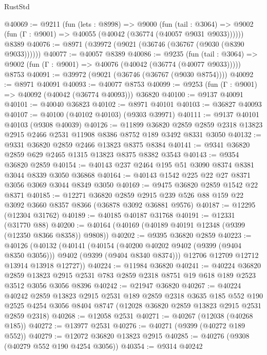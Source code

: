 \begin{lexlean}{RustStd}
\begin{coremodule}
@40069 := @9211
    (fun (lets : @8998) =>
    @9000
      (fun (tail : @3064) =>
      @9002 (fun (Γ : @9001) => @40055 (@40042 (@36774 (@40057 @9031 @9033))))))
    @8389
@40076 := @8971 (@39972 (@9021 (@36746 (@36767 (@9030 (@8390 @9033))))))
@40077 := @40057 @8389
@40086 := @9235
    (fun (tail : @3064) => @9002 (fun (Γ : @9001) => @40076 (@40042 (@36774 (@40077 @9033)))))
    @8753
@40091 := @39972 (@9021 (@36746 (@36767 (@9030 @8754))))
@40092 := @8971 @40091
@40093 := @40077 @8753
@40099 := @9253 (fun (Γ : @9001) => @40092 (@40042 (@36774 @40093))) @36820
@40100 := @9137 @40091
@40101 := @40040 @36823
@40102 := @8971 @40101
@40103 := @36827 @40093
@40107 := @40100 (@40102 @40103) (@9303 @39971)
@40111 := @9137 @40101 @40103 (@9308 @40039)
@40126 := @11899
    @36820
    @2859
    @2859
    @2318
    @13823
    @2915
    @2466
    @2531
    @11908
    @8386
    @8752
    @189
    @3492
    @8331
    @3050
@40132 := @9331 @36820 @2859 @2466 @13823 @8375 @8384
@40141 := @9341 @36820 @2859 @629 @2465 @1315 @13823 @8375 @8382 @3543
@40143 := @9354 @36820 @2859
@40154 := @40143 @237 @2464 @195 @51 @3090 @8374 @8381 @3044 @8339 @3050 @36868
@40164 := @40143 @1542 @225 @22 @27 @8371 @3056 @3069 @3044 @8349 @3050
@40169 := @9475 @36820 @2859 @1542 @22 @8371
@40185 := @12271
    @36820
    @2859
    @2915
    @239
    @526
    @88
    @159
    @22
    @3092
    @3660
    @8357
    @8366
    (@36878 @3092 @36881 @9576)
@40187 := @12295 (@12304 @31762)
@40189 := @40185 @40187 @31768
@40191 := @12331 (@31770 @88)
@40200 := @40164 (@40169 (@40189 @40191 @12348 (@9399 (@12350 @8366 @8358)) @9808))
@40202 := @9395 @36820 @2859
@40223 := @40126
    (@40132
      (@40141
        (@40154 (@40200 @40202 @9402 (@9399 (@9404 @8350 @3056))) @9402 (@9399 (@9404 @8340 @8374)))
        @12706
        @12709
        @12712
        @13914
        @13918
        @12727))
@40224 := @11984 @36820
@40241 := @40224
    @36820
    @2859
    @13823
    @2915
    @2531
    @783
    @2859
    @2318
    @8751
    @19
    @618
    @189
    @2523
    @3512
    @3056
    @3056
    @8396
@40242 := @21947 @36820
@40267 := @40224
    @40242
    @2859
    @13823
    @2915
    @2531
    @189
    @2859
    @2318
    @3635
    @185
    @552
    @190
    @2525
    @4254
    @3056
    @8404
    @8747
    (@12028 @36820 @2859 @13823 @2915 @2531 @2859 @2318)
@40268 := @12058 @2531
@40271 := @40267 (@12038 (@40268 @185))
@40272 := @13977 @2531
@40276 := @40271 (@9399 (@40272 @189 @552))
@40279 := @12072 @36820 @13823 @2915
@40285 := @40276 (@9308 (@40279 @552 @190 @4254 @3056))
@40354 := @9314
    @40242

\end{coremodule}
\end{lexlean}
